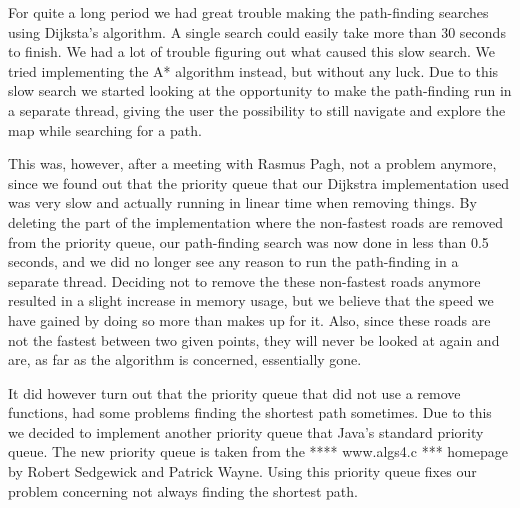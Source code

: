 For quite a long period we had great trouble making the path-finding searches using Dijksta's algorithm. A single search could easily take more than 30 seconds to finish. We had a lot of trouble figuring out what caused this slow search. We tried implementing the A* algorithm instead, but without any luck. Due to this slow search we started looking at the opportunity to make the path-finding run in a separate thread, giving the user the possibility to still navigate and explore the map while searching for a path. 

This was, however, after a meeting with Rasmus Pagh, not a problem anymore, since we found out that the priority queue that our Dijkstra implementation used was very slow and actually running in linear time when removing things. By deleting the part of the implementation where the non-fastest roads are removed from the priority queue, our path-finding search was now done in less than 0.5 seconds, and we did no longer see any reason to run the path-finding in a separate thread. Deciding not to remove the these non-fastest roads anymore resulted in a slight increase in memory usage, but we believe that the speed we have gained by doing so more than makes up for it. Also, since these roads are not the fastest between two given points, they will never be looked at again and are, as far as the algorithm is concerned, essentially gone.

It did however turn out that the priority queue that did not use a remove functions, had some problems finding the shortest path sometimes. Due to this we decided to implement another priority queue that Java's standard priority queue. The new priority queue is taken from the **** www.algs4.c *** homepage by Robert Sedgewick and Patrick Wayne. Using this priority queue fixes our problem concerning not always finding the shortest path.
